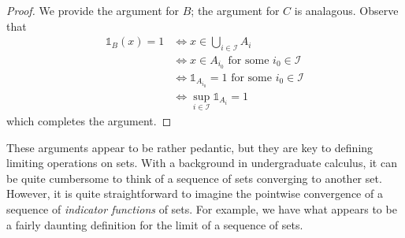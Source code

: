 \begin{proof}
We provide the argument for $B$; the argument for $C$ is analagous.
Observe that
\begin{align*}
\mathds{1}_{B}\left(x\right)=1 & \Longleftrightarrow x\in\bigcup_{i\in\mathcal{I}}A_{i}\\
 & \Longleftrightarrow x\in A_{i_{0}}\textrm{ for some }i_{0}\in\mathcal{I}\\
 & \Longleftrightarrow\mathds{1}_{A_{i_{0}}}=1\text{ for some }i_{0}\in\mathcal{I}\\
 & \Longleftrightarrow\sup_{i\in\mathcal{I}}\mathds{1}_{A_{i}}=1
\end{align*}
which completes the argument.
\end{proof}
These arguments appear to be rather pedantic, but they are key to
defining limiting operations on sets. With a background in undergraduate
calculus, it can be quite cumbersome to think of a sequence of sets
converging to another set. However, it is quite straightforward to
imagine the pointwise convergence of a sequence of \emph{indicator
functions }of sets. For example, we have what appears to be a fairly
daunting definition for the limit of a sequence of sets.
